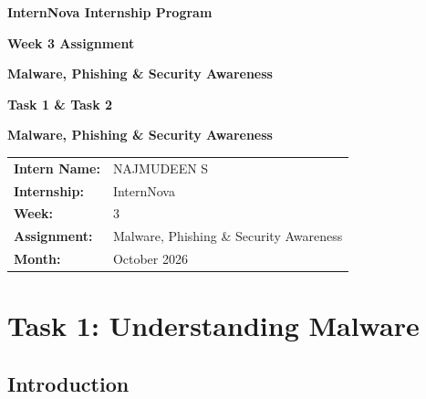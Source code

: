 \documentclass[12pt,a4paper]{article}
\begin{document}


\begin{titlepage}
\centering
\vspace*{1.5cm}

{\Large\textbf{InternNova Internship Program}\par}
\vspace{0.8cm}

{\large\textbf{Week 3 Assignment}\par}
\vspace{1.2cm}

{\LARGE\textbf{Malware, Phishing \& Security Awareness}\par}
\vspace{1.0cm}

{\Large\textbf{Task 1 \& Task 2}\par}
\vspace{0.6cm}

{\large\textbf{Malware, Phishing \& Security Awareness}\par}

\vfill

\begin{tabular}{>{\bfseries}l l}
Intern Name: & NAJMUDEEN S\\
Internship: & InternNova\\
Week: & 3\\
Assignment: & Malware, Phishing \& Security Awareness\\
Month: & October 2026\\
\end{tabular}

\vfill

\end{titlepage}

\clearpage


\section{Task 1: Understanding Malware}

\subsection{Introduction}
\end{document}
